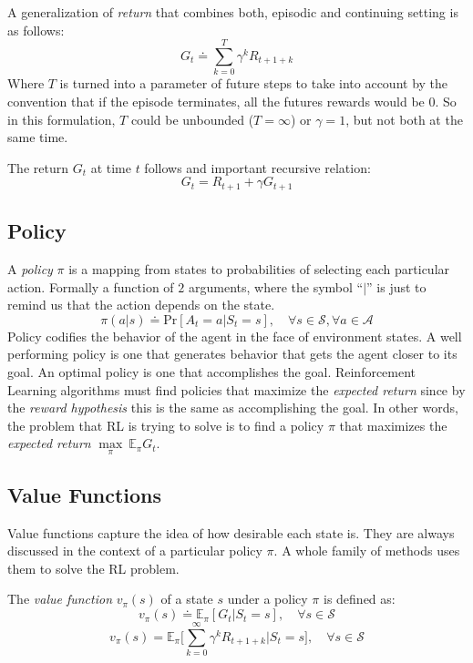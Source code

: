 \documentclass[
  12pt,
  openany]{book}
\begin{document}
A generalization of \emph{return} that combines both, episodic and continuing setting is as follows:
\[G_t \doteq \sum_{k=0}^{T} \gamma^k R_{t+1+k}\]
Where \(T\) is turned into a parameter of future steps to take into account by the convention that if the episode terminates, all the futures rewards would be \(0\). So in this formulation, \(T\) could be unbounded (\(T = \infty\)) or \(\gamma = 1\), but not both at the same time.

The return \(G_t\) at time \(t\) follows and important recursive relation:
\[G_t = R_{t+1} + \gamma G_{t+1}\]

\hypertarget{policy}{%
\subsection{Policy}\label{policy}}

A \emph{policy} \(\pi\) is a mapping from states to probabilities of selecting each particular action. Formally a function of \(2\) arguments, where the symbol ``\(|\)'' is just to remind us that the action depends on the state.
\[ \pi(a|s) \doteq \text{Pr}[A_t=a | S_t=s], \quad \forall s \in \mathcal{S}, \forall a \in \mathcal{A}\]
Policy codifies the behavior of the agent in the face of environment states. A well performing policy is one that generates behavior that gets the agent closer to its goal. An optimal policy is one that accomplishes the goal. Reinforcement Learning algorithms must find policies that maximize the \emph{expected return} since by the \emph{reward hypothesis} this is the same as accomplishing the goal. In other words, the problem that RL is trying to solve is to find a policy \(\pi\) that maximizes the \emph{expected return} \(\underset {\pi} \max\ \mathds{E}_\pi G_t\).

\hypertarget{value-functions}{%
\subsection{Value Functions}\label{value-functions}}

Value functions capture the idea of how desirable each state is. They are always discussed in the context of a particular policy \(\pi\). A whole family of methods uses them to solve the RL problem.

The \emph{value function} \(v_\pi(s)\) of a state \(s\) under a policy \(\pi\) is defined as:
\[v_\pi(s) \doteq \mathds{E}_\pi [ G_t | S_t = s ], \quad \forall s \in \mathcal{S}\]
\[v_\pi(s) = \mathds{E}_\pi \bigg[ \sum_{k=0}^{\infty} \gamma^k R_{t+1+k} \bigg| S_t = s \bigg], \quad \forall s \in \mathcal{S}\]
\end{document}
